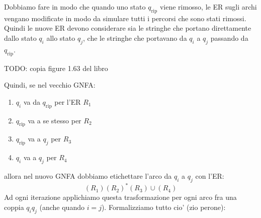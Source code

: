 Dobbiamo fare in modo che quando uno stato $ q_{\text{rip}} $ viene rimosso, le ER sugli archi vengano modificate in modo da simulare tutti i percorsi che sono stati rimossi. Quindi le nuove ER devono considerare sia le stringhe che portano direttamente dallo stato $ q_i $ allo stato $ q_j $, che le stringhe che portavano da $ q_i $ a $ q_j $ passando da $ q_{\text{rip}} $.

TODO: copia figure 1.63 del libro

Quindi, se nel vecchio GNFA:
\begin{enumerate}
  \item $ q_i $ va da $ q_{\text{rip}} $ per l'ER $ R_1 $
  \item $ q_{\text{rip}} $ va a se stesso per $ R_2 $
  \item $ q_{\text{rip}} $ va a $ q_j $ per $ R_3 $
  \item $ q_i $ va a $ q_j $ per $ R_4 $
\end{enumerate}
allora nel nuovo GNFA dobbiamo etichettare l'arco da $ q_i $ a $ q_j $ con l'ER:
\[
  (R_1)(R_2)^*(R_3)\cup (R_4)
\]
Ad ogni iterazione applichiamo questa trasformazione per ogni arco fra una coppia $ q_i q_j $ (anche quando $ i = j $). Formalizziamo tutto cio' (zio perone):
